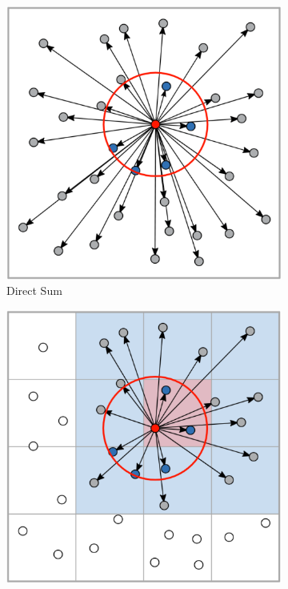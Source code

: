 \begin{figure}[h!]
    \centering
    \begin{subfigure}{0.22\textwidth}
        \centering
        \includegraphics[width=\linewidth]{imgs/directsum.png}
        \caption{\scriptsize Direct Sum}
        \label{fig:directsum}
    \end{subfigure}
    \hfill
    \begin{subfigure}{0.22\textwidth}
        \centering
        \includegraphics[width=\linewidth]{imgs/linkedcells.png}

\end{subfigure}
\end{figure}
